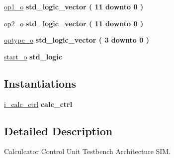 \begin{DoxyCompactItemize}
\item 
\hyperlink{classtb__calc__ctrl_1_1sim_a6f9205824086fe0482a394c7f072e796}{op1\+\_\+o} {\bfseries \textcolor{comment}{std\+\_\+logic\+\_\+vector}\textcolor{vhdlchar}{ }\textcolor{vhdlchar}{(}\textcolor{vhdlchar}{ }\textcolor{vhdlchar}{ } \textcolor{vhdldigit}{11} \textcolor{vhdlchar}{ }\textcolor{keywordflow}{downto}\textcolor{vhdlchar}{ }\textcolor{vhdlchar}{ } \textcolor{vhdldigit}{0} \textcolor{vhdlchar}{ }\textcolor{vhdlchar}{)}\textcolor{vhdlchar}{ }} 
\item 
\hyperlink{classtb__calc__ctrl_1_1sim_af5024d472f05c7fbf163c2c3f778943b}{op2\+\_\+o} {\bfseries \textcolor{comment}{std\+\_\+logic\+\_\+vector}\textcolor{vhdlchar}{ }\textcolor{vhdlchar}{(}\textcolor{vhdlchar}{ }\textcolor{vhdlchar}{ } \textcolor{vhdldigit}{11} \textcolor{vhdlchar}{ }\textcolor{keywordflow}{downto}\textcolor{vhdlchar}{ }\textcolor{vhdlchar}{ } \textcolor{vhdldigit}{0} \textcolor{vhdlchar}{ }\textcolor{vhdlchar}{)}\textcolor{vhdlchar}{ }} 
\item 
\hyperlink{classtb__calc__ctrl_1_1sim_a3d9de39243579036e652202bffb053ff}{optype\+\_\+o} {\bfseries \textcolor{comment}{std\+\_\+logic\+\_\+vector}\textcolor{vhdlchar}{ }\textcolor{vhdlchar}{(}\textcolor{vhdlchar}{ }\textcolor{vhdlchar}{ } \textcolor{vhdldigit}{3} \textcolor{vhdlchar}{ }\textcolor{keywordflow}{downto}\textcolor{vhdlchar}{ }\textcolor{vhdlchar}{ } \textcolor{vhdldigit}{0} \textcolor{vhdlchar}{ }\textcolor{vhdlchar}{)}\textcolor{vhdlchar}{ }} 
\item 
\hyperlink{classtb__calc__ctrl_1_1sim_a79c808faf9c87162f79d816d112283e2}{start\+\_\+o} {\bfseries \textcolor{comment}{std\+\_\+logic}\textcolor{vhdlchar}{ }} 
\end{DoxyCompactItemize}
\subsection*{Instantiations}
 \begin{DoxyCompactItemize}
\item 
\hyperlink{classtb__calc__ctrl_1_1sim_af496ee9657b7be2d83caead5654a279c}{i\+\_\+calc\+\_\+ctrl}  {\bfseries calc\+\_\+ctrl}   
\end{DoxyCompactItemize}


\subsection{Detailed Description}
Calculcator Control Unit Testbench Architecture S\+IM. 

